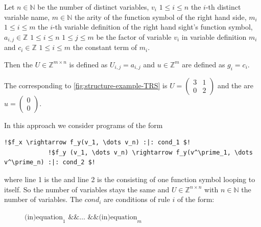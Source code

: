 \begin{definition}
	\label{def:update}
	Let $n \in \mathbb{N}$ be the number of distinct variables, $v_i$ $1 \le i \le n$ the $i$-th distinct		variable name, $m \in \mathbb{N}$ the arity of the function symbol of the right hand side, $m_i$ $1 \le i \le m$ the $i$-th variable definition of the right hand sight's function symbol, $a_{i,j} \in \mathbb{Z}$ $1 \le i \le n$ $1 \le j \le m$ be the factor of variable $v_i$ in variable definition $m_i$ and $c_i \in \mathbb{Z}$ $1 \le i \le m$ the constant term of $m_i$. \newline
	
	Then the \updatematrix $U \in \mathbb{Z}^{m \times n}$ is defined as $U_{i,j}=a_{i,j}$ and \updateconstants $u \in \mathbb{Z}^m$ are defined as $g_i = c_i$.
\end{definition}
\begin{example}
	The corresponding \updatematrix to \autoref{fig:structure-example-TRS} is $U = \begin{pmatrix} 3 & 1 \\ 0 & 2 \end{pmatrix}$ and the \updateconstants are $u = \begin{pmatrix} 0 \\ 0 \end{pmatrix}$.
\end{example}
\begin{corollary}
	In this approach we consider programs of the form 
		\begin{lstlisting}[escapechar=!]
			!$f_x \rightarrow f_y(v_1, \dots v_n) :|: cond_1 $!
			!$f_y (v_1, \dots v_n) \rightarrow f_y(v^\prime_1, \dots v^\prime_n) :|: cond_2 $!
		\end{lstlisting}
	where line 1 is the \stem and line 2 is the \loopt consisting of one function symbol looping to itself. So the number of variables stays the same and $U \in \mathbb{Z}^{n\times n}$ with $n \in \mathbb{N}$ the number of variables. 
	The $cond_i$ are conditions of rule $i$ of the form: 
	\begin{figure}[H]
		\centering
		$\text{(in)equation}_1 \text{ \&\& } \dots \text{ \&\& } \text{(in)equation}_m$
	\end{figure}

\end{corollary}

